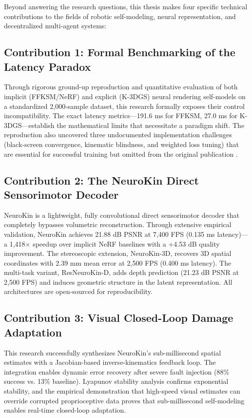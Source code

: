 \documentclass[12pt,a4paper,oneside]{report}
\begin{document}
Beyond answering the research questions, this thesis makes four specific technical contributions to the fields of robotic self-modeling, neural representation, and decentralized multi-agent systems:

\subsection{Contribution 1: Formal Benchmarking of the Latency Paradox}

Through rigorous ground-up reproduction and quantitative evaluation of both implicit (FFKSM/NeRF) and explicit (K-3DGS) neural rendering self-models on a standardized 2,000-sample dataset, this research formally exposes their control incompatibility. The exact latency metrics---191.6 ms for FFKSM, 27.0 ms for K-3DGS---establish the mathematical limits that necessitate a paradigm shift. The reproduction also uncovered three undocumented implementation challenges (black-screen convergence, kinematic blindness, and weighted loss tuning) that are essential for successful training but omitted from the original publication \cite{hu2024teaching}.

\subsection{Contribution 2: The NeuroKin Direct Sensorimotor Decoder}

NeuroKin is a lightweight, fully convolutional direct sensorimotor decoder that completely bypasses volumetric reconstruction. Through extensive empirical validation, NeuroKin achieves 21.88 dB PSNR at 7,400 FPS (0.135 ms latency)---a 1,418$\times$ speedup over implicit NeRF baselines with a +4.53 dB quality improvement. The stereoscopic extension, NeuroKin-3D, recovers 3D spatial coordinates with 2.39 mm mean error at 2,500 FPS (0.400 ms latency). The multi-task variant, ResNeuroKin-D, adds depth prediction (21.23 dB PSNR at 2,500 FPS) and induces geometric structure in the latent representation. All architectures are open-sourced for reproducibility.

\subsection{Contribution 3: Visual Closed-Loop Damage Adaptation}

This research successfully synthesizes NeuroKin's sub-millisecond spatial estimates with a Jacobian-based inverse-kinematics feedback loop. The integration enables dynamic error recovery after severe fault injection (88\% success vs. 13\% baseline). Lyapunov stability analysis confirms exponential stability, and the empirical demonstration that high-speed visual estimates can override corrupted proprioceptive data proves that sub-millisecond self-modeling enables real-time closed-loop adaptation.
\end{document}
